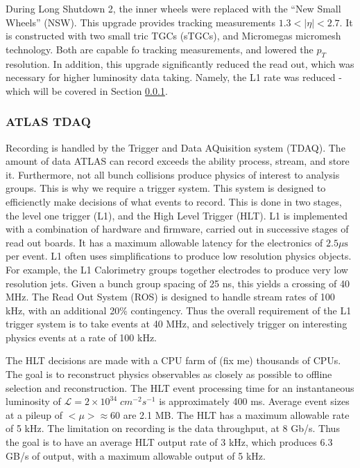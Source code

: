 \documentclass[12pt]{article}
\begin{document}
During Long Shutdown 2, the inner wheels were replaced with the ``New Small
Wheels'' (NSW). This upgrade provides tracking measurements $1.3<|\eta|<2.7$. It
is constructed with two small tric TGCs (sTGCs), and Micromegas micromesh
technology. Both are capable fo tracking measurements, and lowered the $p_T$
resolution. In addition, this upgrade significantly reduced the read
out, which was necessary for higher luminosity data taking. Namely, the L1 rate
was reduced - which will be covered in Section \ref{sec:tdaq}.

\subsubsection{ATLAS TDAQ}\label{sec:tdaq}
Recording is handled by the Trigger and Data AQuisition system (TDAQ). The
amount of data ATLAS can record exceeds the ability process, stream, and store
it. Furthermore, not all bunch collisions produce physics of interest to
analysis groups. This is why we require a trigger system. This system is
designed to efficienctly make decisions of what events to record. This is done
in two stages, the level one trigger (L1), and the High Level Trigger (HLT). L1
is implemented with a combination of hardware and firmware, carried out in
successive stages of read out boards. It has a maximum allowable latency for the
electronics of $2.5 \mu\text{s}$ per event. L1 often uses simplifications to
produce low resolution physics objects. For example, the L1 Calorimetry groups
together electrodes to produce very low resolution jets. Given a bunch group
spacing of 25 ns, this yields a crossing of 40 MHz. The Read Out System (ROS) is
designed to handle stream rates of 100 kHz, with an additional 20\% contingency.
Thus the overall requirement of the L1 trigger system is to take events at 40
MHz, and selectively trigger on interesting physics events at a rate of 100 kHz.

The HLT decisions are made with a CPU farm of (fix me) thousands of CPUs. The
goal is to reconstruct physics observables as closely as possible to offline
selection and reconstruction. The HLT event processing time for an instantaneous
luminosity of $\mathscr{L} = 2\times 10^{34}\;cm^{-2}s^{-1}$ is approximately
400 ms.  Average event sizes at a pileup of $<\mu> \approx 60$ are 2.1 MB. The
HLT has a maximum allowable rate of 5 kHz. The limitation on recording is the
data throughput, at 8 Gb/s. Thus the goal is to have an average HLT output rate
of 3 kHz, which produces 6.3 GB/s of output, with a maximum allowable output of
5 kHz.
\end{document}
